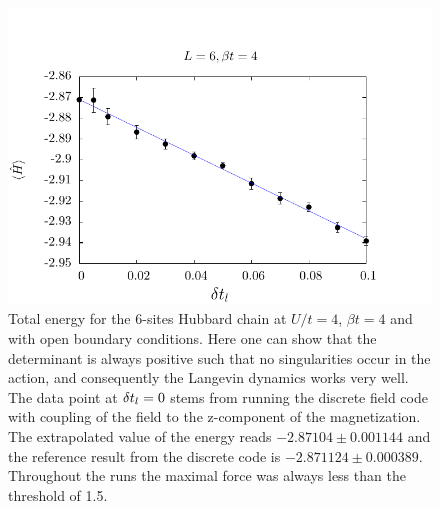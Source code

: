 \begin{figure}[H]
        \begin{center}
                \includegraphics[scale=0.9]{Figures/Langevin.pdf}
            \end{center}
        \caption{\label{Langevin.fig}   Total energy for the 6-sites Hubbard chain at $U/t=4$, $\beta t = 4$ and with open boundary conditions.   Here one can show that the determinant is always positive such that  no   singularities occur in the action, and consequently the Langevin dynamics works very well.  The data point at $\delta t_{l} =0$ stems from running the  discrete  field code with coupling  of the field to the z-component of the magnetization.  The extrapolated value of the energy reads  $-2.87104   \pm 0.001144$ and the reference result from the discrete code is $  -2.871124   \pm  0.000389 $.  Throughout the runs the maximal force was always less than the threshold of 1.5.   }
\end{figure}


